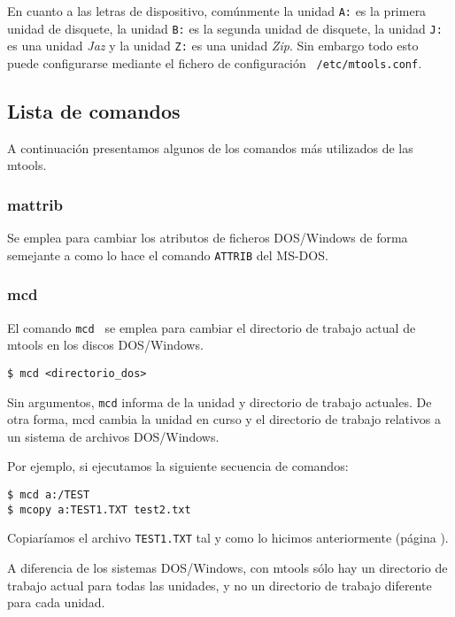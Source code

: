 En cuanto a  las letras de dispositivo, comúnmente la  unidad {\tt A:}
es la  primera unidad de  disquete, la unidad  {\tt B:} es  la segunda
unidad de disquete,  la unidad {\tt J:}  es una unidad {\em  Jaz} y la
unidad  {\tt Z:}  es  una  unidad {\em  Zip}.  Sin  embargo todo  esto
puede   configurarse  mediante  el fichero  de  configuración  {\tt
/etc/mtools.conf}.

\subsection {Lista de comandos}

A continuación presentamos  algunos de los comandos  más utilizados de
las {\sf mtools}.

\subsubsection{mattrib}

Se emplea para cambiar los  atributos de ficheros DOS/Windows de forma
semejante a como lo hace el comando {\tt ATTRIB} del MS-DOS.

\subsubsection{mcd}

El comando {\tt mcd } se  emplea para cambiar el directorio de trabajo
actual de {\sf mtools} en los discos DOS/Windows.

\begin{verbatim}
$ mcd <directorio_dos>
\end{verbatim}

Sin argumentos, {\tt mcd} informa de la unidad y directorio de trabajo
actuales. De otra forma, mcd cambia la unidad en curso y el directorio
de trabajo relativos a un sistema de archivos DOS/Windows.

Por ejemplo, si ejecutamos la siguiente secuencia de comandos:

\begin{verbatim}
$ mcd a:/TEST
$ mcopy a:TEST1.TXT test2.txt
\end{verbatim}

Copiaríamos  el  archivo  {\tt  TEST1.TXT}   tal  y  como  lo  hicimos
anteriormente (página \pageref{mcopyej}).

A diferencia de los sistemas DOS/Windows, con {\sf mtools} sólo hay un
directorio  de  trabajo  actual  para  todas las  unidades,  y  no  un
directorio de trabajo diferente para cada unidad.

